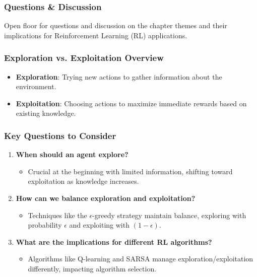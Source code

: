 \documentclass[aspectratio=169]{beamer}
\begin{document}
\begin{frame}[fragile]
    \frametitle{Questions \& Discussion}
    Open floor for questions and discussion on the chapter themes and their implications for Reinforcement Learning (RL) applications.
\end{frame}

\begin{frame}[fragile]
    \frametitle{Exploration vs. Exploitation Overview}
    \begin{itemize}
        \item \textbf{Exploration}: Trying new actions to gather information about the environment.
        \item \textbf{Exploitation}: Choosing actions to maximize immediate rewards based on existing knowledge.
    \end{itemize}
\end{frame}

\begin{frame}[fragile]
    \frametitle{Key Questions to Consider}
    \begin{enumerate}
        \item \textbf{When should an agent explore?}
        \begin{itemize}
            \item Crucial at the beginning with limited information, shifting toward exploitation as knowledge increases.
        \end{itemize}
        
        \item \textbf{How can we balance exploration and exploitation?}
        \begin{itemize}
            \item Techniques like the $\epsilon$-greedy strategy maintain balance, exploring with probability $\epsilon$ and exploiting with $(1 - \epsilon)$.
        \end{itemize}
        
        \item \textbf{What are the implications for different RL algorithms?}
        \begin{itemize}
            \item Algorithms like Q-learning and SARSA manage exploration/exploitation differently, impacting algorithm selection.
        \end{itemize}
    \end{enumerate}
\end{frame}
\end{document}
